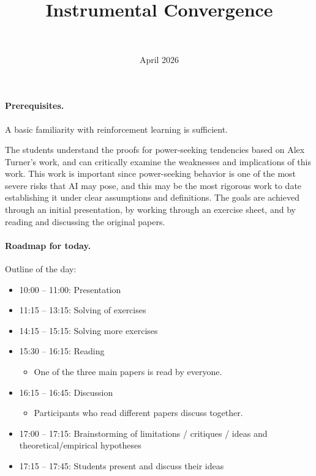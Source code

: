 \documentclass[11pt]{article}
\title{Instrumental Convergence}
\author{\authorname{Leon Lang}\\ \affiliation{ILIAD}}
\date{April 2026}
\begin{document}
\maketitle

\paragraph{Prerequisites.}

A basic familiarity with reinforcement learning is sufficient.

\begin{learningoutcomes}
The students understand the proofs for power-seeking tendencies based on Alex
Turner's work, and can critically examine the weaknesses and implications of
this work. This work is important since power-seeking behavior is one of the
most severe risks that AI may pose, and this may be the most rigorous work to
date establishing it under clear assumptions and definitions. The goals are
achieved through an initial presentation, by working through an exercise sheet,
and by reading and discussing the original papers.
\end{learningoutcomes}

\paragraph{Roadmap for today.}

Outline of the day:

\begin{itemize}
  \item 10:00 -- 11:00: Presentation
  \item 11:15 -- 13:15: Solving of exercises
  \item 14:15 -- 15:15: Solving more exercises
  \item 15:30 -- 16:15: Reading
\begin{itemize}
  \item One of the three main papers is read by everyone.
\end{itemize}
  \item 16:15 -- 16:45: Discussion
\begin{itemize}
  \item Participants who read different papers discuss together.
\end{itemize}
  \item 17:00 -- 17:15: Brainstorming of limitations / critiques / ideas and theoretical/empirical hypotheses
  \item 17:15 -- 17:45: Students present and discuss their ideas
\end{itemize}
\end{document}
